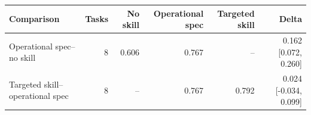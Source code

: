 \begin{tabular}{lrrrrr}
\toprule
Comparison & Tasks & No skill & Operational spec & Targeted skill & Delta \\
\midrule
Operational spec--no skill & 8 & 0.606 & 0.767 & -- & 0.162 [0.072, 0.260] \\
Targeted skill--operational spec & 8 & -- & 0.767 & 0.792 & 0.024 [-0.034, 0.099] \\
\bottomrule
\end{tabular}
